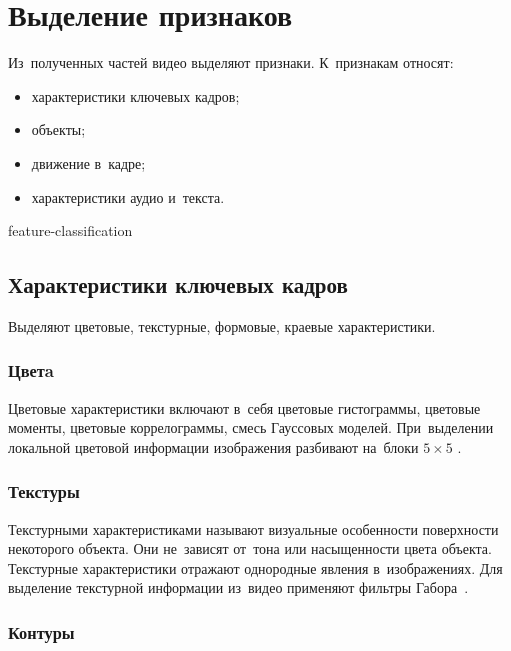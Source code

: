 
\section{Выделение признаков}

Из~полученных частей видео выделяют признаки.
К~признакам относят:
\begin{itemize}
    \item характеристики ключевых кадров;
    \item объекты;
    \item движение в~кадре;
    \item характеристики аудио и~текста.
\end{itemize}


\begin{figuredt}
    {feature-classification}
\end{figuredt}


\subsection{Характеристики ключевых кадров}

Выделяют цветовые, текстурные, формовые, краевые характеристики.

\subsubsection{Цветa}

Цветовые характеристики включают в~себя цветовые гистограммы,
цветовые моменты,
цветовые коррелограммы,
смесь Гауссовых моделей.
При~выделении локальной цветовой информации изображения разбивают
на~блоки $5 \times 5$ \cite{Yan:2007}.


\subsubsection{Текстуры}

Текстурными характеристиками называют визуальные особенности поверхности
некоторого объекта. Они не~зависят от~тона или насыщенности цвета объекта.
Текстурные характеристики отражают однородные явления в~изображениях.
Для выделение текстурной информации
из~видео применяют фильтры Габора\ \cite{Adcock:2004}.

\subsubsection{Контуры}

